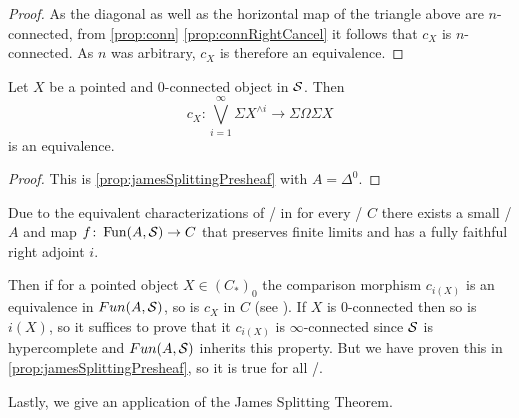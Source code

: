 \begin{prop}
\begin{proof}
        As the diagonal as well as the horizontal map of the triangle above are $n$-connected, from \cref{prop:conn} \ref{prop:connRightCancel} it follows that $c_X$ is $n$-connected. 
        As $n$ was arbitrary, $c_X$ is therefore an equivalence.
    \end{proof}
\end{prop}
\begin{corollary}\label{cor:classicalJamesSplitting}
    Let $X$ be a pointed and $0$-connected object in $\mathcal{S}$.
    Then     
    \begin{equation*}
        c_X\colon\bigvee\limits_{i=1}^{\infty}\Sigma X^{\wedge i}\to\Sigma\Omega\Sigma X
    \end{equation*}
    is an equivalence. 
    \begin{proof}
        This is \cref{prop:jamesSplittingPresheaf} with $A=\Delta^0$.
    \end{proof}
\end{corollary}
\begin{remark}\label{rem:genTopoiComparisonMapEq}
    Due to the equivalent characterizations of \inftytops/ in \cite[Definition 6.1.0.4]{HTT} for every \inftytop/ $C$ there exists a small \inftycat/ $A$ and map $f\colon\operatorname{Fun}(A,\mathcal{S})\to C$ that preserves finite limits and has a fully faithful right adjoint $i$.
    
    Then if for a pointed object $X\in\left(C_*\right)_0$ the comparison morphism $c_{i(X)}$ is an equivalence in $Fun(A,\mathcal{S})$, so is $c_X$ in $C$ (see \cite[Lemma 4.17]{splittings_21}).
    If $X$ is $0$-connected then so is $i(X)$, so it suffices to prove that it $c_{i(X)}$ is $\infty$-connected since $\mathcal{S}$ is hypercomplete and $Fun(A,\mathcal{S})$ inherits this property. %
    But we have proven this in \cref{prop:jamesSplittingPresheaf}, so it is true for all \inftytops/.
\end{remark}
Lastly, we give an application of the James Splitting Theorem.
